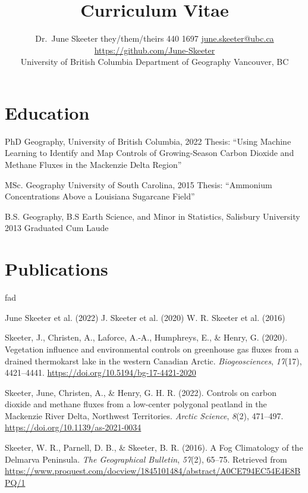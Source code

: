 \documentclass[
]{article}
\title{ \vspace{-1.5em}
\bf Curriculum Vitae \vspace{-.5em}
}
\author{
      {Dr.~June Skeeter 
    \authorcr %
    they/them/theirs
    \authorcr
    604 440 1697
    \authorcr
    \href{mailto:june.skeeter@ubc.ca}{june.skeeter@ubc.ca}}
    \authorcr
    \href{https://github.com/June-Skeeter}{https://github.com/June-Skeeter}
    

          University of British Columbia
      \authorcr
      Department of Geography
      \authorcr
      Vancouver, BC 
      }
\date{}
\newlength{\cslhangindent}
\newlength{\cslentryspacingunit} %
\newenvironment{CSLReferences}[2] %
 {%
  \setlength{\parindent}{0pt}
  \ifodd #1
  \let\oldpar\par
  \def\par{\hangindent=\cslhangindent\oldpar}
  \fi
  \setlength{\parskip}{#2\cslentryspacingunit}
 }%
 {}
\begin{document}
\maketitle
\ifdefined\Shaded\renewenvironment{Shaded}{\begin{tcolorbox}[breakable, boxrule=0pt, borderline west={3pt}{0pt}{shadecolor}, frame hidden, interior hidden, enhanced, sharp corners]}{\end{tcolorbox}}\fi

\hypertarget{education}{%
\section{Education}\label{education}}

PhD Geography, University of British Columbia, 2022 Thesis: ``Using
Machine Learning to Identify and Map Controls of Growing-Season Carbon
Dioxide and Methane Fluxes in the Mackenzie Delta Region''

MSc. Geography University of South Carolina, 2015 Thesis: ``Ammonium
Concentrations Above a Louisiana Sugarcane Field''

B.S. Geography, B.S Earth Science, and Minor in Statistics, Salisbury
University 2013 Graduated Cum Laude

\hypertarget{publications}{%
\section{Publications}\label{publications}}

fad

June Skeeter et al. (2022) J. Skeeter et al. (2020) W. R. Skeeter et al.
(2016)

\hypertarget{refs-2}{}
\begin{CSLReferences}{1}{0}
\leavevmode{}%
Skeeter, J., Christen, A., Laforce, A.-A., Humphreys, E., \& Henry, G.
(2020). Vegetation influence and environmental controls on greenhouse
gas fluxes from a drained thermokarst lake in the western {Canadian}
{Arctic}. \emph{Biogeosciences}, \emph{17}(17), 4421--4441.
\url{https://doi.org/10.5194/bg-17-4421-2020}

\leavevmode{}%
Skeeter, June, Christen, A., \& Henry, G. H. R. (2022). Controls on
carbon dioxide and methane fluxes from a low-center polygonal peatland
in the {Mackenzie} {River} {Delta}, {Northwest} {Territories}.
\emph{Arctic Science}, \emph{8}(2), 471--497.
\url{https://doi.org/10.1139/as-2021-0034}

\leavevmode{}%
Skeeter, W. R., Parnell, D. B., \& Skeeter, B. R. (2016). A {Fog}
{Climatology} of the {Delmarva} {Peninsula}. \emph{The Geographical
Bulletin}, \emph{57}(2), 65--75. Retrieved from
\url{https://www.proquest.com/docview/1845101484/abstract/A0CE794EC54E4E8BPQ/1}

\end{CSLReferences}
\end{document}
